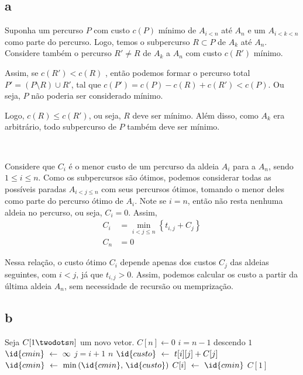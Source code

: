 \subsection{a} \label{sec:2:a}

Suponha um percurso $P$ com custo $c(P)$ mínimo de $A_{i < n}$ até $A_n$ e um $A_{i < k < n}$ como parte do percurso. Logo, temos o subpercurso $R \subset P$ de $A_k$ até $A_n$. Considere também o percurso $R' \ne R$ de $A_k$ a $A_n$ com custo $c\left(R'\right)$ mínimo.

Assim, se $c\left(R'\right) < c(R)$ , então podemos formar o percurso total $P' = (P \setminus R) \cup R'$, tal que $c\left(P'\right) = c(P) - c(R) + c\left(R'\right) < c(P)$. Ou seja, $P$ não poderia ser considerado mínimo.

Logo, $c(R) \leq c\left(R'\right)$, ou seja, $R$ deve ser mínimo. Além disso, como $A_k$ era arbitrário, todo subpercurso de $P$ também deve ser mínimo.

~

Considere que $C_i$ é o menor custo de um percurso da aldeia $A_i$ para a $A_n$, sendo $1 \leq i \leq n$. Como os subpercursos são ótimos, podemos considerar todas as possíveis paradas $A_{i < j \leq n}$ com seus percursos ótimos, tomando o menor deles como parte do percurso ótimo de $A_i$. Note se $i = n$, então não resta nenhuma aldeia no percurso, ou seja, $C_i = 0$. Assim,
\begin{align*}
    C_i &= \min_{i < j \leq n}\left\{t_{i, j} + C_j\right\} \\
    C_n &= 0
\end{align*}

Nessa relação, o custo ótimo $C_i$ depende apenas dos custos $C_j$ das aldeias seguintes, com $i < j$, já que $t_{i, j} > 0$. Assim, podemos calcular os custo a partir da última aldeia $A_n$, sem necessidade de recursão ou memprização.

\itemdsep
\subsection{b}

\begin{codebox}
    \li Seja $C[1 \twodots n]$ um novo vetor. \label{linha:a1:1}
    \li
    \li $C[n] \gets 0$ \label{linha:a1:2}
    \li {} $i = n - 1$ descendo  $1$ \label{linha:for:1}
        \Do
    \li     $\id{cmin} \gets \infty$ \label{linha:a2:1}
    \li     {} $j = i + 1$  $n$ \label{linha:for:2}
            \Do
    \li         $\id{custo} \gets t[i][j] + C[j]$ \label{linha:a3:1}
    \li         $\id{cmin} \gets \min\left(\id{cmin},\, \id{custo}\right)$ \label{linha:a3:2}
            \End
    \li     $C[i] \gets \id{cmin}$ \label{linha:a2:2}
        \End
    \li
    \li {} $C[1]$ \label{linha:a1:3}
\end{codebox}

